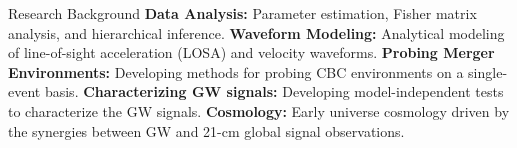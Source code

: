 
\begin{rubric}{Research Background}
\entry*[] \textbf{Data Analysis:} Parameter estimation, Fisher matrix analysis, and hierarchical inference. 
%
\entry*[] \textbf{Waveform Modeling:} Analytical modeling of line-of-sight acceleration (LOSA) and velocity waveforms. 
%
\entry*[] \textbf{Probing Merger Environments:} Developing methods for probing CBC environments on a single-event basis. 
%
\entry*[] \textbf{Characterizing GW signals:} Developing model-independent tests to characterize the GW signals. 
%
\entry*[] \textbf{Cosmology:} Early universe cosmology driven by the synergies between GW and 21-cm global signal observations.
     
\end{rubric}
